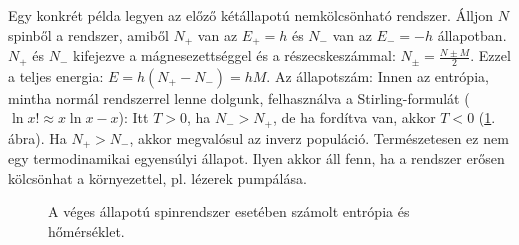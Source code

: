    Egy konkrét példa legyen az előző kétállapotú nemkölcsönható rendszer. Álljon $N$ spinből a rendszer, amiből $N_+$ van az $E_+=h$ és $N_-$ van az $E_-=-h$ állapotban. $N_+$ és $N_-$ kifejezve a mágnesezettséggel és a részecskeszámmal: $N_\pm=\frac{N\pm M}{2}$.
   Ezzel a teljes energia: $E=h(N_+-N_-)=hM$.
   Az állapotszám:
   Innen az entrópia, mintha normál rendszerrel lenne dolgunk, felhasználva a Stirling-formulát ($\ln x!\approx x\ln x-x$):
   Itt $T>0$, ha $N_->N_+$, de ha fordítva van, akkor $T<0$ (\ref{fig:B08-NegT}. ábra).
   Ha $N_+>N_-$, akkor megvalósul az inverz populáció.
   Természetesen ez nem egy termodinamikai egyensúlyi állapot.
   Ilyen akkor áll fenn, ha a rendszer erősen kölcsönhat a környezettel, pl. lézerek pumpálása. 
   \begin{figure}[ht!]
    \centering
     \hspace{6pt}
    \caption{A véges állapotú spinrendszer esetében számolt entrópia és hőmérséklet.}\label{fig:B08-NegT}
   \end{figure}

